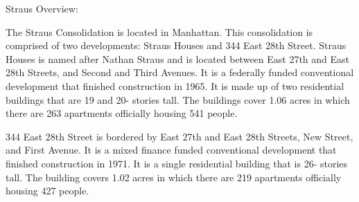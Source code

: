 Straus Overview:      

    

The Straus Consolidation is located in Manhattan. This consolidation is comprised of two developments: Straus Houses and 344 East 28th Street. Straus Houses is named after Nathan Straus and is located between East 27th and East 28th Streets, and Second and Third Avenues. It is a federally funded conventional development that finished construction in 1965. It is made up of two residential buildings that are 19 and 20- stories tall. The buildings cover 1.06 acres in which there are 263 apartments officially housing 541 people.  



344 East 28th Street is bordered by East 27th and East 28th Streets, New Street, and First Avenue. It is a mixed finance funded conventional development that finished construction in 1971. It is a single residential building that is 26- stories tall. The building covers 1.02 acres in which there are 219 apartments officially housing 427 people.